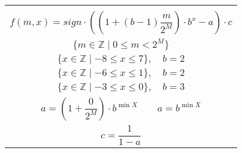 \documentclass[12pt]{standalone}
\begin{document}
    \begin{minipage}{9cm}

        \begin{tabular}{|c|}
        \hline
        \\

            \vbox{\begin{equation*}
            f(m, x) = sign \cdot ((1 + (b - 1) \frac{m}{2^{M}}) \cdot b^{x} - a) \cdot c
            \end{equation*}}

        \\

            \vbox{\begin{equation*}
            \{ m \in \mathbb{Z} \mid 0 \leq m < 2^{M} \}
            \end{equation*}}

        \\

            \vbox{\begin{equation*}\tag{4 bits}
            \{ x \in \mathbb{Z} \mid -8 \leq x \leq 7 \},
            \quad
            b = 2
            \end{equation*}}

        \\

            \vbox{\begin{equation*}\tag{3 bits}
            \{ x \in \mathbb{Z} \mid -6 \leq x \leq 1 \},
            \quad
            b = 2
            \end{equation*}}

        \\

            \vbox{\begin{equation*}\tag{2 bits}
            \{ x \in \mathbb{Z} \mid -3 \leq x \leq 0 \},
            \quad
            b = 3
            \end{equation*}}

        \\

            \vbox{\begin{equation*}
            a = (1 + \frac{0}{2^{M}}) \cdot b^{\min{X}}
            \quad \quad
            a = b^{\min{X}}
            \end{equation*}}

        \\

            \vbox{\begin{equation*}
            c = \frac{1}{1 - a}
            \end{equation*}}

        \\
        \hline
        \end{tabular}

    \end{minipage}
\end{document}
